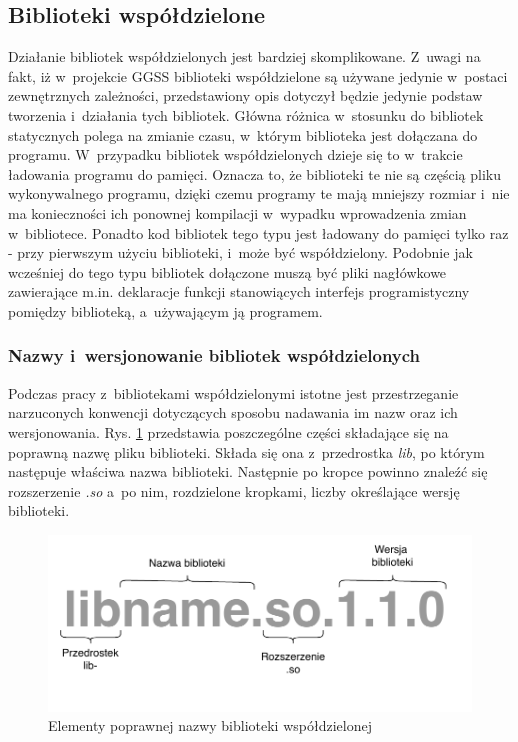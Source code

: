 
\subsection{Biblioteki współdzielone}
Działanie bibliotek współdzielonych jest bardziej skomplikowane. Z~uwagi na fakt, iż w~projekcie GGSS biblioteki współdzielone są używane jedynie w~postaci zewnętrznych zależności, przedstawiony opis dotyczył będzie jedynie podstaw tworzenia i~działania tych bibliotek. Główna różnica w~stosunku do bibliotek statycznych polega na zmianie czasu, w~którym biblioteka jest dołączana do programu. W~przypadku bibliotek współdzielonych dzieje się to w~trakcie ładowania programu do pamięci. Oznacza to, że biblioteki te nie są częścią pliku wykonywalnego programu, dzięki czemu programy te mają mniejszy rozmiar i~nie ma konieczności ich ponownej kompilacji w~wypadku wprowadzenia zmian w~bibliotece. Ponadto kod bibliotek tego typu jest ładowany do pamięci tylko raz - przy pierwszym użyciu biblioteki, i~może być współdzielony. Podobnie jak wcześniej do tego typu bibliotek dołączone muszą być pliki nagłówkowe zawierające m.in. deklaracje funkcji stanowiących interfejs programistyczny pomiędzy biblioteką, a~używającym ją programem.

\newpage

\subsubsection*{Nazwy i~wersjonowanie bibliotek współdzielonych}
Podczas pracy z~bibliotekami współdzielonymi istotne jest przestrzeganie narzuconych konwencji dotyczących sposobu nadawania im nazw oraz ich wersjonowania. Rys. \ref{fig:sharedName} przedstawia poszczególne części składające się na poprawną nazwę pliku biblioteki. Składa się ona z~przedrostka \textit{lib}, po którym następuje właściwa nazwa biblioteki. Następnie po kropce powinno znaleźć się rozszerzenie \textit{.so} a~po nim, rozdzielone kropkami, liczby określające wersję biblioteki. 

\begin{figure}[H]
\centering
\includegraphics[width=\textwidth]{res/sharedLibName}
\caption{Elementy poprawnej nazwy biblioteki współdzielonej}
\label{fig:sharedName}
\end{figure}

